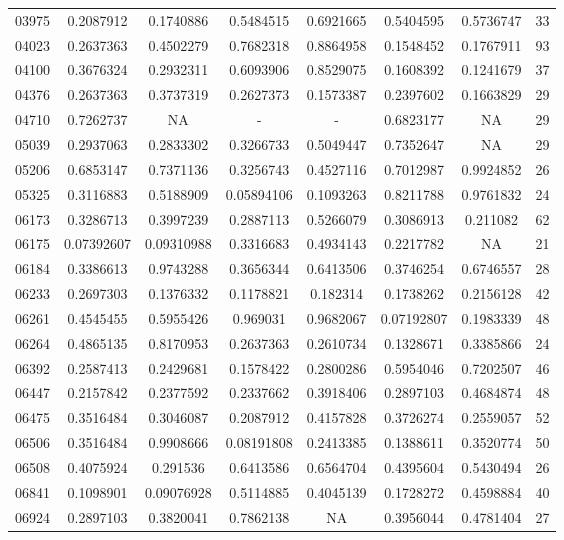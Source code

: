 \begin{anexosenv}
\begin{table}[H]
{\begin{tabular}{cccccccc}
03975 & 0.2087912 & 0.1740886 & 0.5484515 & 0.6921665 & 0.5404595 & 0.5736747 & 33 \\ 
04023 & 0.2637363 & 0.4502279 & 0.7682318 & 0.8864958 & 0.1548452 & 0.1767911 & 93 \\ 
04100 & 0.3676324 & 0.2932311 & 0.6093906 & 0.8529075 & 0.1608392 & 0.1241679 & 37 \\ 
04376 & 0.2637363 & 0.3737319 & 0.2627373 & 0.1573387 & 0.2397602 & 0.1663829 & 29 \\ 
04710 & 0.7262737 & NA & - & - & 0.6823177 & NA & 29 \\ 
05039 & 0.2937063 & 0.2833302 & 0.3266733 & 0.5049447 & 0.7352647 & NA & 29 \\ 
05206 & 0.6853147 & 0.7371136 & 0.3256743 & 0.4527116 & 0.7012987 & 0.9924852 & 26 \\ 
05325 & 0.3116883 & 0.5188909 & 0.05894106 & 0.1093263 & 0.8211788 & 0.9761832 & 24 \\ 
06173 & 0.3286713 & 0.3997239 & 0.2887113 & 0.5266079 & 0.3086913 & 0.211082 & 62 \\ 
06175 & 0.07392607 & 0.09310988 & 0.3316683 & 0.4934143 & 0.2217782 & NA & 21 \\ 
06184 & 0.3386613 & 0.9743288 & 0.3656344 & 0.6413506 & 0.3746254 & 0.6746557 & 28 \\ 
06233 & 0.2697303 & 0.1376332 & 0.1178821 & 0.182314 & 0.1738262 & 0.2156128 & 42 \\ 
06261 & 0.4545455 & 0.5955426 & 0.969031 & 0.9682067 & 0.07192807 & 0.1983339 & 48 \\ 
06264 & 0.4865135 & 0.8170953 & 0.2637363 & 0.2610734 & 0.1328671 & 0.3385866 & 24 \\ 
06392 & 0.2587413 & 0.2429681 & 0.1578422 & 0.2800286 & 0.5954046 & 0.7202507 & 46 \\ 
06447 & 0.2157842 & 0.2377592 & 0.2337662 & 0.3918406 & 0.2897103 & 0.4684874 & 48 \\ 
06475 & 0.3516484 & 0.3046087 & 0.2087912 & 0.4157828 & 0.3726274 & 0.2559057 & 52 \\ 
06506 & 0.3516484 & 0.9908666 & 0.08191808 & 0.2413385 & 0.1388611 & 0.3520774 & 50 \\ 
06508 & 0.4075924 & 0.291536 & 0.6413586 & 0.6564704 & 0.4395604 & 0.5430494 & 26 \\ 
06841 & 0.1098901 & 0.09076928 & 0.5114885 & 0.4045139 & 0.1728272 & 0.4598884 & 40 \\ 
06924 & 0.2897103 & 0.3820041 & 0.7862138 & NA & 0.3956044 & 0.4781404 & 27 \\ 

\end{tabular}}
\end{table}
\end{anexosenv}
